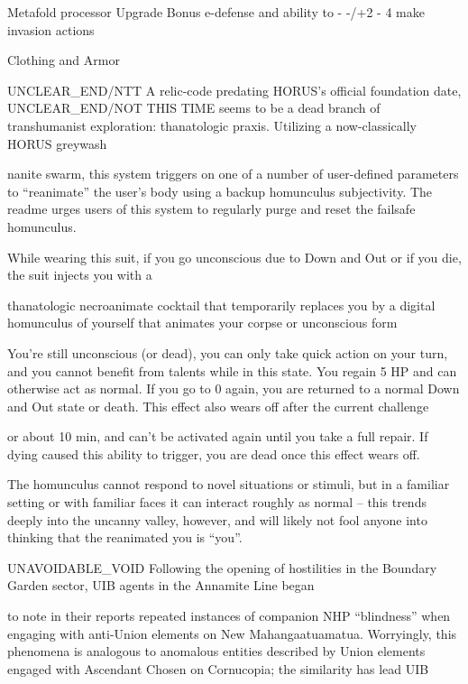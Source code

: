  Metafold processor        Upgrade     Bonus e-defense and ability to           -        -/+2         -     4 
                                       make invasion actions 

                                               Clothing and Armor
 

UNCLEAR\_END/NTT  
A relic-code predating HORUS’s official foundation date, UNCLEAR\_END/NOT THIS TIME seems to be a  
dead branch of transhumanist exploration: thanatologic praxis. Utilizing a now-classically HORUS greywash  

nanite swarm, this system triggers on one of a number of user-defined parameters to “reanimate” the user’s  
body using a backup homunculus subjectivity. The readme urges users of this system to regularly purge  
and reset the failsafe homunculus.   

While wearing this suit, if you go unconscious due to Down and Out or if you die, the suit injects you with a  

thanatologic necroanimate cocktail that temporarily replaces you by a digital homunculus of yourself that  
animates your corpse or unconscious form
 

You’re still unconscious (or dead), you can only take quick action on your turn, and you cannot benefit  
from talents while in this state. You regain 5 HP and can otherwise act as normal. If you go to 0 again, you  
are returned to a normal Down and Out state or death. This effect also wears off after the current challenge  

or about 10 min, and can’t be activated again until you take a full repair. If dying caused this ability to  
trigger, you are dead once this effect wears off.
 

The homunculus cannot respond to novel situations or stimuli, but in a familiar setting or with familiar faces  
it can interact roughly as normal -- this trends deeply into the uncanny valley, however, and will likely not  
fool anyone into thinking that the reanimated you is “you”. 
 

UNAVOIDABLE\_VOID  
Following the opening of hostilities in the Boundary Garden sector, UIB agents in the Annamite Line began  

to note in their reports repeated instances of companion NHP “blindness” when engaging with anti-Union  
elements on New Mahangaatuamatua. Worryingly, this phenomena is analogous to anomalous entities  
described by Union elements engaged with Ascendant Chosen on Cornucopia; the similarity has lead UIB  

